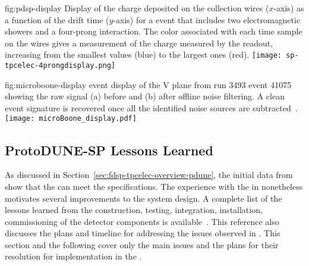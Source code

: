 \begin{dunefigure}
{fig:pdsp-display}
{Display of the charge deposited on the collection wires ($x$-axis) as
a function of the drift time ($y$-axis) for a  event 
that includes two electromagnetic showers and a four-prong interaction.
The color associated with each time sample on the 
wires gives a measurement of the charge measured by the 
readout, increasing from the smallest values (blue) to the largest
ones (red).}
\texttt{[image: sp-tpcelec-4prongdisplay.png]}
\end{dunefigure}

\begin{dunefigure}
{fig:microboone-display}
{ \twod event display of the V plane from run 3493 
event 41075 showing the raw signal (a) before and (b) after offline 
noise filtering. A clean event signature is recovered once all the 
identified noise sources are subtracted~\cite{Acciarri:2017sde}.}
\texttt{[image: microBoone\_display.pdf]}
\end{dunefigure}

\subsection{ProtoDUNE-SP Lessons Learned}
\label{sec:fdsp-tpcelec-overview-lessons}

As discussed in %
Section~\ref{sec:fdsp-tpcelec-overview-pdune}, the initial data from 
show that the  %
can meet the  %
specifications. %
The experience with the  in  nonetheless motivates several improvements %
to the  system design.  %
A complete list of the lessons learned from the construction, testing, integration,
installation, commissioning of the  detector components
is available~\cite{bib:docdb12367}. This reference also discusses %
the plans and timeline for addressing the issues 
observed in . %
This  section and the following cover only the main issues  %
and the plans for their resolution  
for implementation in the . %

